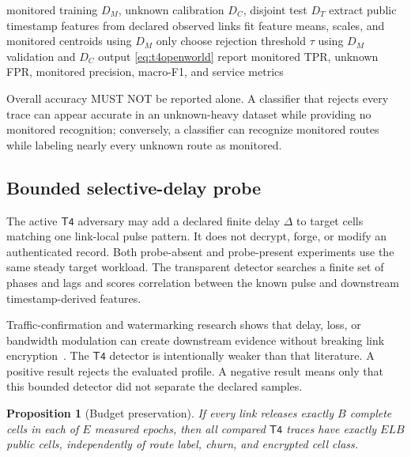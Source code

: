 \documentclass[11pt,oneside]{article}
\newcommand{\Tfour}{\ensuremath{\mathsf{T4}}}
\newtheorem{proposition}{Proposition}
\begin{document}
\begin{algorithm}[ht]
\caption{Reference \Tfour{} open-world evaluation}
\label{alg:t4openworld}
\begin{algorithmic}[1]
\Require monitored training $D_M$, unknown calibration $D_C$, disjoint test $D_T$
\State extract public timestamp features from declared observed links
\State fit feature means, scales, and monitored centroids using $D_M$ only
\State choose rejection threshold $\tau$ using $D_M$ validation and $D_C$
  \State output \eqref{eq:t4openworld}
\EndFor
\State report monitored TPR, unknown FPR, monitored precision, macro-F1, and service metrics
\end{algorithmic}
\end{algorithm}

Overall accuracy MUST NOT be reported alone. A classifier that rejects every trace can appear accurate in an unknown-heavy dataset while providing no monitored recognition; conversely, a classifier can recognize monitored routes while labeling nearly every unknown route as monitored.

\subsection{Bounded selective-delay probe}

The active \Tfour{} adversary may add a declared finite delay $\Delta$ to target cells matching one link-local pulse pattern. It does not decrypt, forge, or modify an authenticated record. Both probe-absent and probe-present experiments use the same steady target workload. The transparent detector searches a finite set of phases and lags and scores correlation between the known pulse and downstream timestamp-derived features.

Traffic-confirmation and watermarking research shows that delay, loss, or bandwidth modulation can create downstream evidence without breaking link encryption~\cite{dropmark,duster,activeflowmark2026}. The \Tfour{} detector is intentionally weaker than that literature. A positive result rejects the evaluated profile. A negative result means only that this bounded detector did not separate the declared samples.

\begin{proposition}[Budget preservation]
If every link releases exactly $B$ complete cells in each of $E$ measured epochs, then all compared \Tfour{} traces have exactly $ELB$ public cells, independently of route label, churn, and encrypted cell class.
\end{proposition}
\end{document}
